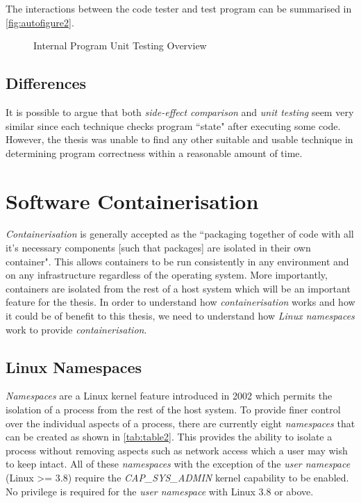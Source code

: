 \documentclass[hidelinks]{report}
\begin{document}
The interactions between the code tester and test program can be summarised in \autoref{fig:autofigure2}.

\begin{figure}[h]
	\centering
	\caption{Internal Program Unit Testing Overview}
	\label{fig:autofigure2}
\end{figure}

\subsection{Differences}
It is possible to argue that both \textit{side-effect comparison} and \textit{unit testing} seem very similar since each technique checks program ``state" after executing some code. However, the thesis was unable to find any other suitable and usable technique in determining program correctness within a reasonable amount of time.

\section{Software Containerisation}
\textit{Containerisation} is generally accepted as the ``packaging together of code with all it's necessary components [such that packages] are isolated in their own container". This allows containers to be run consistently in any environment and on any infrastructure regardless of the operating system. More importantly, containers are isolated from the rest of a host system which will be an important feature for the thesis.\cite{containerisationGeneral}
In order to understand how \textit{containerisation} works and how it could be of benefit to this thesis, we need to understand how \textit{Linux namespaces} work to provide \textit{containerisation}.

\subsection{Linux Namespaces}
\textit{Namespaces} are a Linux kernel feature introduced in 2002 which permits the isolation of a process from the rest of the host system. To provide finer control over the individual aspects of a process, there are currently eight \textit{namespaces} that can be created as shown in \ref{tab:table2}. This provides the ability to isolate a process without removing aspects such as network access which a user may wish to keep intact. All of these \textit{namespaces} with the exception of the \textit{user namespace} (Linux >= 3.8) require the \textit{CAP\_SYS\_ADMIN} kernel capability to be enabled. No privilege is required for the \textit{user namespace} with Linux 3.8 or above.\cite{containerisationManPage}
\end{document}
